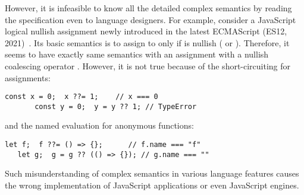 However, it is infeasible to know all the detailed complex semantics by reading
the specification even to language designers. For example, consider a JavaScript
logical nullish assignment
 newly introduced in the latest ECMAScript (ES12,
2021)~\cite{es12}. Its basic semantics is to assign  to 
only if  is nullish ( or ). Therefore,
it seems to have exactly same semantics with an assignment 
with a nullish coalescing operator .  However, it is not true because
of the short-circuiting for assignments:
\begin{lstlisting}[style=JS]
       const x = 0;  x ??= 1;    // x === 0
       const y = 0;  y = y ?? 1; // TypeError
\end{lstlisting}
and the named evaluation for anonymous functions:
\begin{lstlisting}[style=JS]
   let f;  f ??= () => {};      // f.name === "f"
   let g;  g = g ?? (() => {}); // g.name === ""
\end{lstlisting}
Such misunderstanding of complex semantics in various language features causes
the wrong implementation of JavaScript applications or even JavaScript engines.

